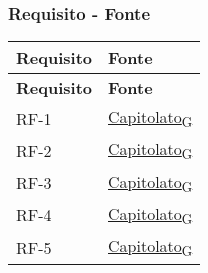 \subsubsection{Requisito - Fonte}
\begin{longtable}{|>{\centering\arraybackslash}m{}|>{\centering\arraybackslash}m{}|}
	\hline
	\textbf{Requisito} & \textbf{Fonte}                                                                                                                                                                                                                                       \\\hline
	\endfirsthead
	\hline
	\textbf{Requisito} & \textbf{Fonte}                                                                                                                                                                                                                                       \\\hline
	\endhead
	RF-1               & \href{https://7last.github.io/docs/rtb/documentazione-interna/glossario\#capitolato}{Capitolato\textsubscript{G}}                                                                                                                                    \\\hline
	RF-2               & \href{https://7last.github.io/docs/rtb/documentazione-interna/glossario\#capitolato}{Capitolato\textsubscript{G}}                                                                                                                                    \\\hline
	RF-3               & \href{https://7last.github.io/docs/rtb/documentazione-interna/glossario\#capitolato}{Capitolato\textsubscript{G}}                                                                                                                                    \\\hline
	RF-4               & \href{https://7last.github.io/docs/rtb/documentazione-interna/glossario\#capitolato}{Capitolato\textsubscript{G}}                                                                                                                                    \\\hline
	RF-5               & \href{https://7last.github.io/docs/rtb/documentazione-interna/glossario\#capitolato}{Capitolato\textsubscript{G}}                                                                                                                                    \\\hline

\end{longtable}
